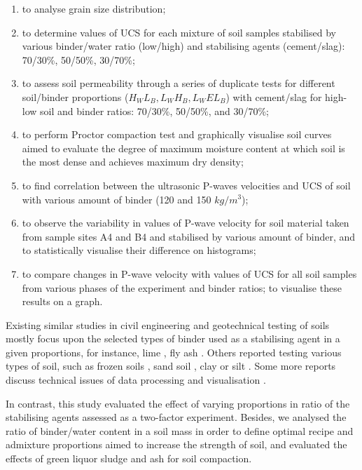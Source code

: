 \documentclass{amestyle}
\begin{document}
\begin{enumerate}
   \item to analyse grain size distribution;
   \item to determine values of UCS for each mixture of soil samples stabilised by various binder/water ratio (low/high) and stabilising agents (cement/slag): 70/30\%, 50/50\%, 30/70\%; 
  \item to assess soil permeability through a series of duplicate tests for different soil/binder proportions ($H_WL_B,L_WH_B,L_WEL_B$) with cement/slag for high-low soil and binder ratios: 70/30\%, 50/50\%, and 30/70\%;
  \item to perform Proctor compaction test and graphically visualise soil curves aimed to evaluate the degree of maximum moisture content at which soil is the most dense and achieves maximum dry density;
  \item to find correlation between the ultrasonic P-waves velocities and UCS of soil with various amount of binder (120 and 150 $kg/m^3$);
  \item to observe the variability in values of P-wave velocity for soil material taken from sample sites A4 and B4 and stabilised by various amount of binder, and to statistically visualise their difference on histograms;
  \item to compare changes in P-wave velocity with values of UCS for all soil samples from various phases of the experiment and binder ratios; to visualise these results on a graph.
\end{enumerate}

Existing similar studies in civil engineering and geotechnical testing of soils mostly focus upon the selected types of binder used as a stabilising agent in a given proportions, for instance, lime \cite{Rao,Mukhtar,Swaidani}, fly ash \cite{Phetchuay}. Others reported testing various types of soil, such as frozen soils \cite{Lemenkov2021b,Lemenkov2021c}, sand soil \cite{Robertson}, clay or silt \cite{Komal}. Some more reports discuss technical issues of data processing and visualisation \cite{Kaellenetal2014,Lemenkov2021c}. 

In contrast, this study evaluated the effect of varying proportions in ratio of the stabilising agents assessed as a two-factor experiment. Besides, we analysed the ratio of binder/water content in a soil mass in order to define optimal recipe and admixture proportions aimed to increase the strength of soil, and evaluated the effects of green liquor sludge and ash for soil compaction. 
\end{document}

